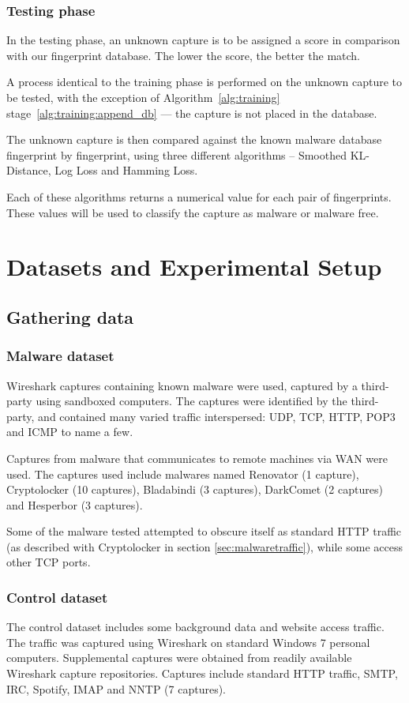 \documentclass[9pt,journal,compsoc]{IEEEtran}
\begin{document}
\subsubsection{Testing phase}
In the testing phase, an unknown capture is to be assigned a score in comparison with our fingerprint database. The lower the score, the better the match.

A process identical to the training phase is performed on the unknown capture to be tested, with the exception of Algorithm~\ref{alg:training} stage~\ref{alg:training:append_db} --- the capture is not placed in the database.
 
The unknown capture is then compared against the known malware database fingerprint by fingerprint, using three different algorithms – Smoothed KL-Distance, Log Loss and Hamming Loss.

Each of these algorithms returns a numerical value for each pair of fingerprints. These values will be used to classify the capture as malware or malware free.
\section{Datasets and Experimental Setup}
\subsection{Gathering data}
\subsubsection{Malware dataset}
Wireshark captures containing known malware were used, captured by a third-party using sandboxed computers.
The captures were identified by the third-party, and contained many varied traffic interspersed: UDP, TCP, HTTP, POP3 and ICMP to name a few.

Captures from malware that communicates to remote machines via WAN were used.
The captures used include malwares named Renovator (1 capture),  Cryptolocker (10 captures), Bladabindi (3 captures), DarkComet (2 captures) and Hesperbor (3 captures).

Some of the malware tested attempted to obscure itself as standard HTTP traffic (as described with Cryptolocker in section \ref{sec:malwaretraffic}), while some access other TCP ports.
\subsubsection{Control dataset}
The control dataset includes some background data and website access traffic.
The traffic was captured using Wireshark on standard Windows 7 personal computers. Supplemental captures were obtained from readily available Wireshark capture repositories.
Captures include standard HTTP traffic, SMTP, IRC, Spotify, IMAP and NNTP (7 captures).
\end{document}
